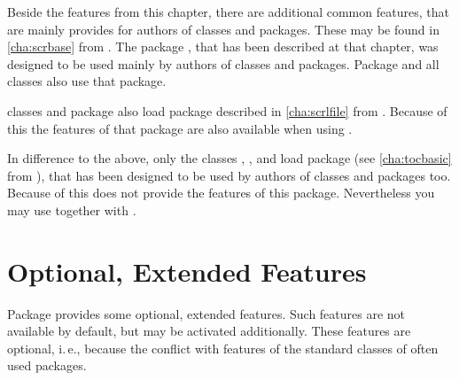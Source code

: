 Beside the features from this chapter, there are additional common features,
that are mainly provides for authors of classes and packages. These may be
found in \autoref{cha:scrbase} from . The package
, that has been described at
that chapter, was designed to be used mainly by authors of classes and
packages. Package  and all \KOMAScript{} classes also use
that package.

\KOMAScript{} classes and package  also load package
 described in
\autoref{cha:scrlfile} from . Because of this the
features of that package are also available when using .

\iftrue %
In difference to the above, only the \KOMAScript{} classes ,
, and  load package  (see
\autoref{cha:tocbasic} from ), that has been
designed to be used by authors of classes and packages too. Because of this
 does not provide the features of this package. Nevertheless
you may use  together with .%
\fi




\section{Optional, Extended Features}

Package  provides some optional, extended features. Such
features are not available by default, but may be activated
additionally. These features are optional, i.\,e., because the conflict with
features of the standard classes of often used packages.

